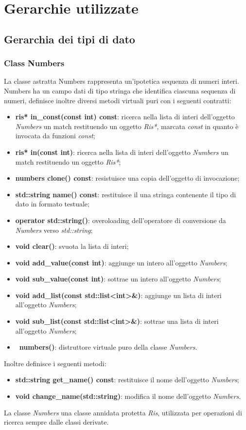 \documentclass[a4paper,10pt]{article}
\begin{document}
	\section{Gerarchie utilizzate}
	\subsection{Gerarchia dei tipi di dato}
	\subsubsection{Class Numbers}
	La classe astratta Numbers rappresenta un’ipotetica sequenza di numeri interi. Numbers ha un campo dati di tipo stringa che identifica ciascuna sequenza di numeri, definisce inoltre diversi metodi virtuali puri con i seguenti contratti:
	\begin{itemize}
		\item \textbf{ris* in\_const(const int) const}: ricerca nella lista di interi dell'oggetto \textit{Numbers} un match restituendo un oggetto \textit{Ris*}, marcata \textit{const} in quanto è invocata da funzioni \textit{const};
	 	\item \textbf{ris* in(const int)}: ricerca nella lista di interi dell'oggetto \textit{Numbers} un match restituendo un oggetto \textit{Ris*};
	 	\item \textbf{numbers\* clone() const}: resistuisce una copia dell'oggetto di invocazione;
		\item \textbf{std::string name() const}: restituisce il una stringa contenente il tipo di dato in formato testuale;
		\item \textbf{operator std::string()}: overoloading dell'operatore di conversione da \textit{Numbers} verso \textit{std::string};
		\item \textbf{void clear()}: svuota la lista di interi;
		\item \textbf{void add\_value(const int)}: aggiunge un intero all'oggetto \textit{Numbers};
		\item \textbf{void sub\_value(const int)}: sottrae un intero all'oggetto \textit{Numbers};
		\item \textbf{void add\_list(const std::list<int>\&)}: aggiunge un lista di interi all'oggetto \textit{Numbers};
		\item \textbf{void sub\_list(const std::list<int>\&)}: sottrae una lista di interi all'oggetto \textit{Numbers};
		\item \textbf{~numbers()}: distruttore virtuale puro della classe \textit{Numbers}.
	\end{itemize}
    Inoltre definisce i seguenti metodi:
    \begin{itemize}
        \item \textbf{std::string get\_name() const}: restituisce il nome dell'oggetto \textit{Numbers};
        \item \textbf{void change\_name(std::string)}: modifica il nome dell'oggetto \textit{Numbers}.
    \end{itemize}
    La classe \textit{Numbers} una classe annidata protetta \textit{Ris}, utilizzata per operazioni di ricerca sempre dalle classi derivate.
    
\end{document}
